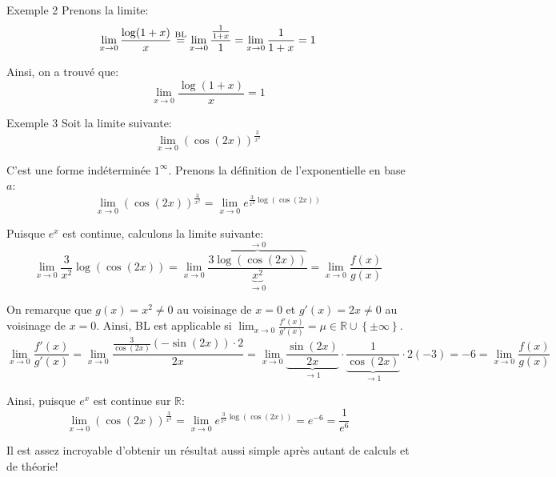 \documentclass[a4paper]{article}
\begin{document}
\begin{parag}{Exemple 2}
    Prenons la limite: 
    \[\lim_{x \to 0} \frac{\log\left(1 + x\right)}{x} \over{=}{BL} \lim_{x \to 0} \frac{\frac{1}{1 + x}}{1} = \lim_{x \to 0} \frac{1}{1 + x} = 1\]
    
    Ainsi, on a trouvé que:
    \[\lim_{x \to 0} \frac{\log\left(1 + x\right)}{x} = 1\]
\end{parag}

\begin{parag}{Exemple 3}
    Soit la limite suivante: 
    \[\lim_{x \to 0} \left(\cos\left(2x\right)\right)^{\frac{3}{x^2}}\]
    
    C'est une forme indéterminée $1^{\infty}$. Prenons la définition de l'exponentielle en base $a$: 
    \[\lim_{x \to 0} \left(\cos\left(2x\right)\right)^{\frac{3}{x^2}} = \lim_{x \to 0} e^{\frac{3}{x^2} \log\left(\cos\left(2x\right)\right)}\]

    Puisque $e^x$ est continue, calculons la limite suivante: 
    \[\lim_{x \to 0} \frac{3}{x^2} \log\left(\cos\left(2x\right)\right) = \lim_{x \to 0} \frac{\overbrace{3\log\left(\cos\left(2x\right)\right)}^{\to 0}}{\underbrace{x^2}_{\to 0}} = \lim_{x \to 0} \frac{f\left(x\right)}{g\left(x\right)}\]
    
    On remarque que $g\left(x\right) = x^2 \neq 0$ au voisinage de $x = 0$ et $g'\left(x\right) = 2x \neq 0$ au voisinage de $x = 0$. Ainsi, BL est applicable si $\lim_{x \to 0} \frac{f'\left(x\right)}{g'\left(x\right)} = \mu \in \mathbb{R} \cup \left\{\pm \infty\right\}$.
    \[\lim_{x \to 0} \frac{f'\left(x\right)}{g'\left(x\right)} = \lim_{x \to 0} \frac{\frac{3}{\cos\left(2x\right)} \left(-\sin\left(2x\right)\right)\cdot 2}{2x} = \lim_{x \to 0} \underbrace{\frac{\sin\left(2x\right)}{2x}}_{\to 1} \cdot \underbrace{\frac{1}{\cos\left(2x\right)}}_{\to 1} \cdot 2\left(-3\right) = -6 = \lim_{x \to 0} \frac{f\left(x\right)}{g\left(x\right)}\]

    Ainsi, puisque $e^x$ est continue sur $\mathbb{R}$: 
    \[\lim_{x \to 0} \left(\cos\left(2x\right)\right)^{\frac{3}{x^2}} = \lim_{x \to 0} e^{\frac{3}{x^2} \log\left(\cos\left(2x\right)\right)} = e^{-6} = \frac{1}{e^6}\]
    
    Il est assez incroyable d'obtenir un résultat aussi simple après autant de calculs et de théorie! \smiley
\end{parag}


 
\end{document}
